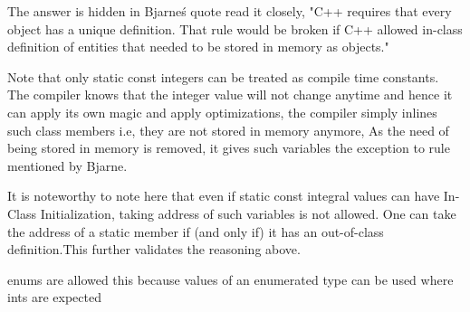 \documentclass[a4paper]{tufte-handout}
\begin{document}
The answer is hidden in Bjarne\'s quote read it closely,
"C++ requires that every object has a unique definition. That rule would be broken if C++ allowed in-class definition of entities that needed to be stored in memory as objects."

Note that only static const integers can be treated as compile time constants. The compiler knows that the integer value will not change anytime and hence it can apply its own magic and apply optimizations, the compiler simply inlines such class members i.e, they are not stored in memory anymore, As the need of being stored in memory is removed, it gives such variables the exception to rule mentioned by Bjarne.

It is noteworthy to note here that even if static const integral values can have In-Class Initialization, taking address of such variables is not allowed. One can take the address of a static member if (and only if) it has an out-of-class definition.This further validates the reasoning above.

enums are allowed this because values of an enumerated type can be used where ints are expected




\end{document}

